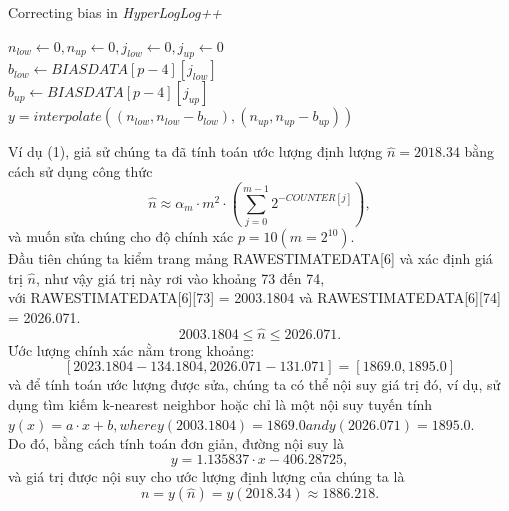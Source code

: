 \documentclass[letterpaper,13pt]{article}
\theoremstyle{mytheor}
\begin{document}
\begin{algorithm}[H]
    \vspace{0.25cm}
    \DontPrintSemicolon
    \LinesNumberedHidden
    \caption[]{Correcting bias in \textit{HyperLogLog++}}
    $n_{low} \gets 0, n_{up} \gets 0, j_{low} \gets 0, j_{up} \gets 0 $\\
    $b_{low} \gets BIASDATA[p-4][j_{low}]$\\
    $b_{up} \gets BIASDATA[p-4][j_{up}]$\\
    $y = interpolate\left(\left(n_{low}, n_{low} - b_{low}\right), \left(n_{up}, n_{up} - b_{up
    }\right)\right)$\\
    \vspace{0.25cm}
\end{algorithm}
\begin{mdframed}
    \vspace{0.25cm}
    Ví dụ (1), giả sử chúng ta đã tính toán ước lượng định lượng $\hat{n} = 2018.34$ bằng cách sử dụng công thức
    \[
    \hat{n} \approx \alpha_m \cdot m^2 \cdot \left(\sum_{j=0}^{m-1}2^{-COUNTER[j]}\right),
    \]
    và muốn sửa chúng cho 
    độ chính xác $p = 10 (m = 2^{10})$.\\
    Đầu tiên chúng ta kiểm trang mảng RAWESTIMATEDATA[6] và xác định giá trị $\hat{n}$, như vậy giá trị này rơi vào khoảng 73 đến 74,\\ với RAWESTIMATEDATA[6][73] = 2003.1804 và
    RAWESTIMATEDATA[6][74] = 2026.071.
    \[2003.1804 \le \hat{n} \le 2026.071.\]
    Ước lượng chính xác nằm trong khoảng:
    \[\left[2023.1804 - 134.1804, 2026.071 - 131.071\right] = \left[1869.0, 1895.0\right]\]
    và để tính toán ước lượng được sửa, chúng ta có thể nội suy giá trị đó, ví dụ, sử dụng tìm kiếm k-nearest neighbor hoặc chỉ là một nội suy tuyến tính\\
    \newpage
    $y(x) = a \cdot x + b, where y(2003.1804) = 1869.0 and y(2026.071) = 1895.0.$\\
    Do đó, bằng cách tính toán đơn giản, đường nội suy là
    \[y = 1.135837 \cdot x - 406.28725,\]
    và giá trị được nội suy cho ước lượng định lượng của chúng ta là
    \[n = y(\hat{n}) = y(2018.34) \approx 1886.218.\]
    
\end{mdframed}
\end{document}
